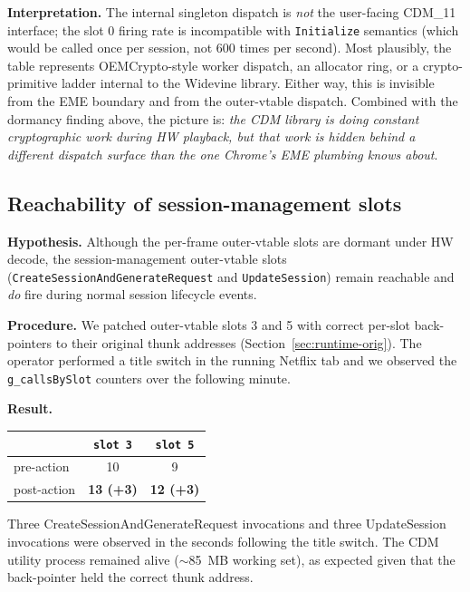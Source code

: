 \documentclass[11pt,letterpaper]{article}
\begin{document}
\textbf{Interpretation.} The internal singleton dispatch is
\emph{not} the user-facing CDM\_11 interface; the slot 0 firing rate
is incompatible with \texttt{Initialize} semantics (which would be
called once per session, not 600 times per second). Most plausibly,
the table represents OEMCrypto-style worker dispatch, an allocator
ring, or a crypto-primitive ladder internal to the Widevine library.
Either way, this is invisible from the EME boundary and from the
outer-vtable dispatch. Combined with the dormancy finding above,
the picture is: \emph{the CDM library is doing constant
cryptographic work during HW playback, but that work is hidden
behind a different dispatch surface than the one Chrome's EME
plumbing knows about}.

\subsection{Reachability of session-management slots}
\label{sec:findings-session}

\textbf{Hypothesis.} Although the per-frame outer-vtable slots are
dormant under HW decode, the session-management outer-vtable slots
(\texttt{CreateSessionAndGenerateRequest} and
\texttt{UpdateSession}) remain reachable and \emph{do} fire during
normal session lifecycle events.

\textbf{Procedure.} We patched outer-vtable slots 3 and 5 with
correct per-slot back-pointers to their original thunk addresses
(Section~\ref{sec:runtime-orig}). The operator performed a title
switch in the running Netflix tab and we observed the
\texttt{g\_callsBySlot} counters over the following minute.

\textbf{Result.}

\begin{center}\small
\begin{tabular}{lcc}
\toprule
& \texttt{slot 3} & \texttt{slot 5} \\
\midrule
pre-action & 10 & 9 \\
post-action & \textbf{13 (+3)} & \textbf{12 (+3)} \\
\bottomrule
\end{tabular}
\end{center}

\noindent Three CreateSessionAndGenerateRequest invocations and three
UpdateSession invocations were observed in the seconds following the
title switch. The CDM utility process remained alive
($\sim$85~MB working set), as expected given that the back-pointer
held the correct thunk address.
\end{document}
